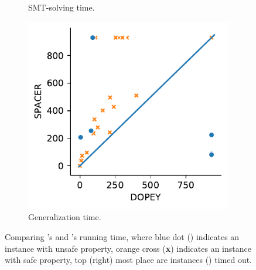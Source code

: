 \begin{figure}[t]
\begin{subfigure}[b]{0.24\textwidth}
    \caption{SMT-solving time.\linebreak}
    \label{subfig:dpy_vs_spc_smt}
	\end{subfigure}
  \begin{subfigure}[b]{0.24\textwidth}
  \centering
    \includegraphics[width=0.99\textwidth]{figures/res-dpy_vs_spc_indgen.pdf}
    \caption{Generalization time.}
    \label{subfig:dpy_vs_spc_ind_gen_sub}
	\end{subfigure}

	\caption{Comparing \dpy's and \spc's running time, where blue dot ({\color{blue}\textbullet}) indicates an instance with unsafe property,  orange cross ({\color{orange}\textbf{x}}) indicates an instance with safe property, top (right) most place are instances \spc (\dpy) timed out.}
  \label{fig:dpy_vs_spc}
\end{figure}


